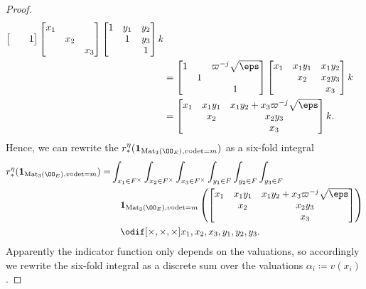 \begin{proof}
\begin{align*}
\begin{bmatrix}
      &   & 1
    \end{bmatrix}
    \begin{bmatrix} x_1 \\ & x_2 \\ && x_3 \end{bmatrix}
    \begin{bmatrix} 1 & y_1 & y_2 \\ & 1 & y_3 \\ & & 1 \end{bmatrix} k \\
    &=
    \begin{bmatrix}
      1 &   & \varpi^{-j}\sqrt\eps \\
      & 1 \\
      &   & 1
    \end{bmatrix}
    \begin{bmatrix} x_1 & x_1 y_1 & x_1 y_2 \\ & x_2 & x_2 y_3 \\ & & x_3 \end{bmatrix} k \\
    &=
    \begin{bmatrix}
      x_1 & x_1 y_1 & x_1 y_2 + x_3 \varpi^{-j} \sqrt\eps \\
      & x_2 & x_2 y_3 \\
      & & x_3
    \end{bmatrix}
    k.
  \end{align*}
  Hence, we can rewrite the $r_\ast^\eta(\mathbf{1}_{\Mat_3(\OO_E), v\circ\det=m})$
  as a six-fold integral
  \begin{align*}
    r_\ast^\eta(\mathbf{1}_{\Mat_3(\OO_E), v\circ\det=m}) =
    & \int_{x_1 \in F^\times} \int_{x_2 \in F^\times} \int_{x_3 \in F^\times}
    \int_{y_1 \in F} \int_{y_2 \in F} \int_{y_3 \in F} \\
    &\quad \mathbf{1}_{\Mat_3(\OO_E), v\circ\det=m} \left(
    \begin{bmatrix}
      x_1 & x_1 y_1 & x_1 y_2 + x_3 \varpi^{-j} \sqrt\eps \\
      & x_2 & x_2 y_3 \\
      & & x_3
    \end{bmatrix}
    \right) \\
    &\quad \odif[{\times,\times,\times}]{x_1,x_2,x_3,y_1,y_2,y_3}.
  \end{align*}
  Apparently the indicator function only depends on the valuations,
  so accordingly we rewrite the six-fold integral as a discrete sum over the valuations
  $\alpha_i \coloneqq v(x_i)$.

\end{proof}

